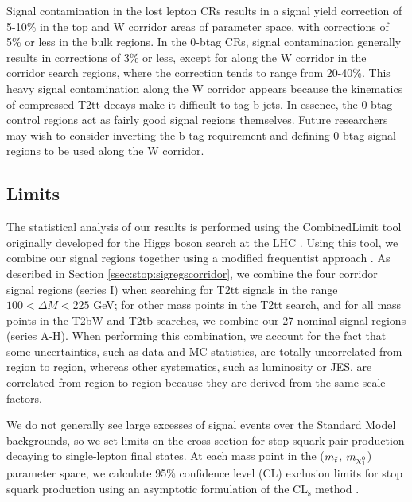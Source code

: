 Signal contamination in the lost lepton CRs results in a signal yield
correction of 5-10\% in the top and W corridor areas of parameter
space, with corrections of 5\% or less in the bulk regions. In the
0-btag CRs, signal contamination generally results in corrections of
3\% or less, except for along the W corridor in the corridor search
regions, where the correction tends to range from 20-40\%. This heavy
signal contamination along the W corridor appears because the
kinematics of compressed T2tt decays make it difficult to tag
b-jets. In essence, the 0-btag control regions act as fairly good
signal regions themselves. Future researchers may wish to consider
inverting the b-tag requirement and defining 0-btag signal regions to
be used along the W corridor.

\subsection{Limits}
\label{ssec:stop:limits}

The statistical analysis of our results is performed using the
CombinedLimit tool originally developed for the Higgs boson search at
the LHC \cite{higgscombine}. Using this tool, we combine our
signal regions together using a modified frequentist approach
\cite{combineregions}. As described in Section
\ref{ssec:stop:sigregscorridor}, we combine the four corridor signal
regions (series I) when searching for T2tt signals in the range $100 < \Delta M <
225$ GeV; for other mass points in the T2tt search, and for all mass
points in the T2bW and T2tb searches, we combine our 27 nominal signal
regions (series A-H). When performing this combination, we account for
the fact that some uncertainties, such as data and MC statistics, are
totally uncorrelated from region to region, whereas other systematics,
such as luminosity or JES, are correlated from region to region
because they are derived from the same scale factors.

We do not generally see large excesses of signal events over the
Standard Model backgrounds, so we set limits on the cross section for
stop squark pair production decaying to single-lepton final states.
At each mass point in the ($m_{\tilde{t}}$, $m_{\tilde{\chi}^0_1}$) parameter space,
we calculate 95\% confidence level (CL) exclusion limits for stop squark
production using an asymptotic formulation of the
CL$_\text{s}$ method \cite{cls,asymptotic}.

